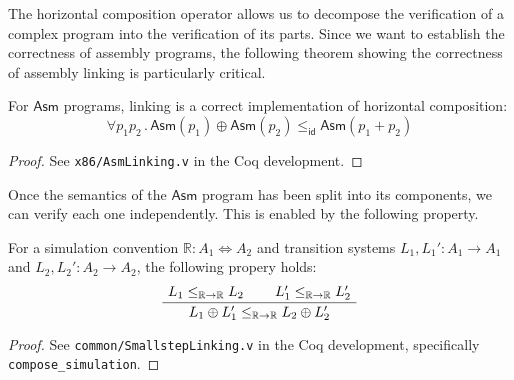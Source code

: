 \documentclass[sigplan,10pt,review,anonymous]{acmart}
\newcommand{\kw}[1]{\ensuremath{ \mathsf{#1} }}
\begin{document}
The horizontal composition operator
allows us to decompose the verification of a complex program
into the verification of its parts.
Since we want to
establish the correctness of assembly programs,
the following theorem showing the correctness
of assembly linking is particularly critical.

\begin{theorem} \label{thm:asmlinking} %
For \kw{Asm} programs,
linking is a correct implementation of
horizontal composition:
\[
    \forall p_1 p_2 \,.\,
      \kw{Asm}(p_1) \oplus \kw{Asm}(p_2)
      \le_\kw{id}
      \kw{Asm}(p_1 + p_2)
\]
\begin{proof}
See \texttt{x86/AsmLinking.v} in the Coq development.
\end{proof}
\end{theorem}

Once the semantics of the \kw{Asm} program
has been split into its components,
we can verify each one independently.
This is enabled by the following property.

\begin{theorem} \label{thm:simlinking} %
For a simulation convention
$\mathbb{R} : A_1 \Leftrightarrow A_2$
and transition systems
$L_1, L_1' : A_1 \rightarrow A_1$ and
$L_2, L_2' : A_2 \rightarrow A_2$,
the following propery holds:
\[
    \AxiomC{$L_1 \le_{\mathbb{R} \rightarrow \mathbb{R}} L_2$}
    \AxiomC{$L_1' \le_{\mathbb{R} \rightarrow \mathbb{R}} L_2'$}
    \BinaryInfC{$L_1 \oplus L_1' \le_{\mathbb{R} \rightarrow \mathbb{R}} L_2 \oplus L_2'$}
    \DisplayProof
\]
\begin{proof}
See \texttt{common/SmallstepLinking.v}
in the Coq development,
specifically \texttt{compose\_simulation}.
\end{proof}
\end{theorem}


%
%
%
\end{document}
